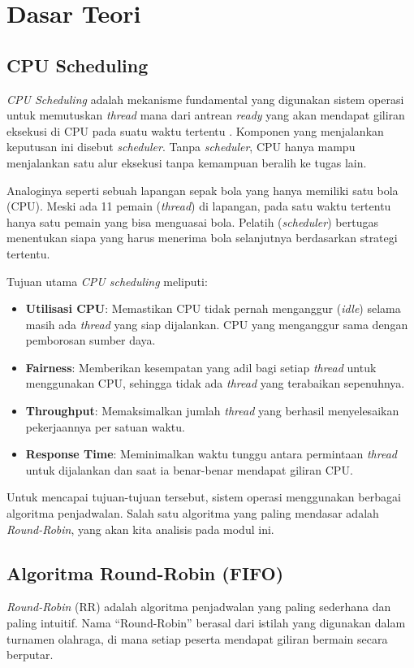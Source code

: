 \newpage
\section{Dasar Teori}

\subsection{CPU Scheduling}
\textit{CPU Scheduling} adalah mekanisme fundamental yang digunakan sistem operasi untuk memutuskan \textit{thread} mana dari antrean \textit{ready} yang akan mendapat giliran eksekusi di CPU pada suatu waktu tertentu \cite{Silberschatz2018}. Komponen yang menjalankan keputusan ini disebut \textit{scheduler}. Tanpa \textit{scheduler}, CPU hanya mampu menjalankan satu alur eksekusi tanpa kemampuan beralih ke tugas lain.

Analoginya seperti sebuah lapangan sepak bola yang hanya memiliki satu bola (CPU). Meski ada 11 pemain (\textit{thread}) di lapangan, pada satu waktu tertentu hanya satu pemain yang bisa menguasai bola. Pelatih (\textit{scheduler}) bertugas menentukan siapa yang harus menerima bola selanjutnya berdasarkan strategi tertentu.

Tujuan utama \textit{CPU scheduling} meliputi:
\begin{itemize}
	\item \textbf{Utilisasi CPU}: Memastikan CPU tidak pernah menganggur (\textit{idle}) selama masih ada \textit{thread} yang siap dijalankan. CPU yang menganggur sama dengan pemborosan sumber daya.
	\item \textbf{Fairness}: Memberikan kesempatan yang adil bagi setiap \textit{thread} untuk menggunakan CPU, sehingga tidak ada \textit{thread} yang terabaikan sepenuhnya.
	\item \textbf{Throughput}: Memaksimalkan jumlah \textit{thread} yang berhasil menyelesaikan pekerjaannya per satuan waktu.
	\item \textbf{Response Time}: Meminimalkan waktu tunggu antara permintaan \textit{thread} untuk dijalankan dan saat ia benar-benar mendapat giliran CPU.
\end{itemize}

Untuk mencapai tujuan-tujuan tersebut, sistem operasi menggunakan berbagai algoritma penjadwalan. Salah satu algoritma yang paling mendasar adalah \textit{Round-Robin}, yang akan kita analisis pada modul ini.

\subsection{Algoritma Round-Robin (FIFO)}
\textit{Round-Robin} (RR) adalah algoritma penjadwalan yang paling sederhana dan paling intuitif. Nama ``Round-Robin'' berasal dari istilah yang digunakan dalam turnamen olahraga, di mana setiap peserta mendapat giliran bermain secara berputar.

